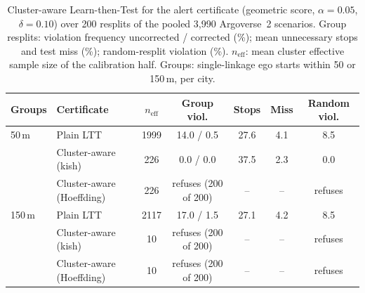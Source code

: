 \documentclass[lettersize,journal]{IEEEtran}
\begin{document}
\makeatletter\setlength{\@fptop}{0pt}\makeatother
\begin{table}[!t]
\caption{Cluster-aware Learn-then-Test for the alert certificate (geometric score, $\alpha=0.05$, $\delta=0.10$) over 200 resplits of the pooled 3{,}990 Argoverse~2 scenarios. Group resplits: violation frequency uncorrected / corrected (\%); mean unnecessary stops and test miss (\%); random-resplit violation (\%). $n_{\mathrm{eff}}$: mean cluster effective sample size of the calibration half. Groups: single-linkage ego starts within 50 or 150\,m, per city.}
\label{tab:s-a15}
\centering
\scriptsize\setlength{\tabcolsep}{2.5pt}
\begin{tabular}{llccccc}
\toprule
Groups & Certificate & $n_{\mathrm{eff}}$ & Group viol. & Stops & Miss & Random viol. \\
\midrule
50\,m & Plain LTT & 1999 & 14.0 / 0.5 & 27.6 & 4.1 & 8.5 \\
 & Cluster-aware (kish) & 226 & 0.0 / 0.0 & 37.5 & 2.3 & 0.0 \\
 & Cluster-aware (Hoeffding) & 226 & refuses (200 of 200) & -- & -- & refuses \\
\midrule
150\,m & Plain LTT & 2117 & 17.0 / 1.5 & 27.1 & 4.2 & 8.5 \\
 & Cluster-aware (kish) & 10 & refuses (200 of 200) & -- & -- & refuses \\
 & Cluster-aware (Hoeffding) & 10 & refuses (200 of 200) & -- & -- & refuses \\
\bottomrule
\end{tabular}
\end{table}
\end{document}
